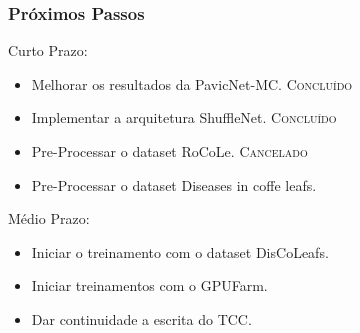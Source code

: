 \documentclass[aspectratio=169]{beamer}
\begin{document}









\begin{frame}
    \frametitle{Próximos Passos}

    \begin{block}{Curto Prazo:}

        \begin{itemize}
            \item Melhorar os resultados da PavicNet-MC. \textsc{Concluído}
            \item Implementar a arquitetura ShuffleNet. \textsc{Concluído}
            \item Pre-Processar o dataset RoCoLe. \textsc{Cancelado}
            \item \color{blue} Pre-Processar o dataset Diseases in coffe leafs.
        \end{itemize}

    \end{block}



    \begin{block}{Médio Prazo:}

        \begin{itemize}
            \item \color{blue} Iniciar o treinamento com o dataset DisCoLeafs.
            \item \color{blue} Iniciar treinamentos com o GPUFarm.
            \item \color{blue} Dar continuidade a escrita do TCC.
        \end{itemize}

    \end{block}




\end{frame}







\end{document}
